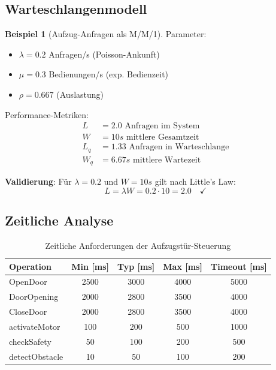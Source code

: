 ﻿\documentclass[a4paper,12pt]{scrreprt}
\theoremstyle{definition}
\newtheorem{beispiel}{Beispiel}[section]
\begin{document}
\subsection{Warteschlangenmodell}

\begin{beispiel}[Aufzug-Anfragen als M/M/1]
	Parameter:
	\begin{itemize}
		\item[-] $\lambda = 0.2$ Anfragen/s (Poisson-Ankunft)
		\item[-] $\mu = 0.3$ Bedienungen/s (exp. Bedienzeit)
		\item[-] $\rho = 0.667$ (Auslastung)
	\end{itemize}
	
	Performance-Metriken:
	\begin{align*}
		L &= 2.0 \text{ Anfragen im System} \\
		W &= 10s \text{ mittlere Gesamtzeit} \\
		L_q &= 1.33 \text{ Anfragen in Warteschlange} \\
		W_q &= 6.67s \text{ mittlere Wartezeit}
	\end{align*}
	
	\textbf{Validierung}: Für $\lambda = 0.2$ und $W = 10s$ gilt nach Little's Law:
	\[
	L = \lambda W = 0.2 \cdot 10 = 2.0 \quad \checkmark
	\]
\end{beispiel}

\subsection{Zeitliche Analyse}

\begin{table}[h]
	\centering
	\begin{tabular}{@{}lcccc@{}}
		\toprule
		\textbf{Operation} & \textbf{Min [ms]} & \textbf{Typ [ms]} & \textbf{Max [ms]} & \textbf{Timeout [ms]} \\
		\midrule
		OpenDoor & 2500 & 3000 & 4000 & 5000 \\
		DoorOpening & 2000 & 2800 & 3500 & 4000 \\
		CloseDoor & 2000 & 2800 & 3500 & 4000 \\
		activateMotor & 100 & 200 & 500 & 1000 \\
		checkSafety & 50 & 100 & 200 & 500 \\
		detectObstacle & 10 & 50 & 100 & 200 \\
		\bottomrule
	\end{tabular}
	\caption{Zeitliche Anforderungen der Aufzugstür-Steuerung}
	\label{tab:timing-analysis}
\end{table}
\end{document}

